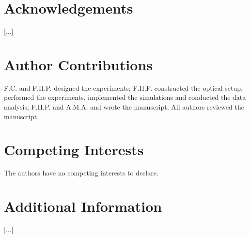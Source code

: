 \documentclass[10pt]{article}
\begin{document}
\begin{multicols}{2}






\printbibliography

\section*{Acknowledgements}
[...]

\section*{Author Contributions}
F.C. and F.H.P. designed the experiments; 
F.H.P. constructed the optical setup, performed the experiments, implemented the simulations and conducted the data analysis; 
F.H.P. and A.M.A. and wrote the manuscript; 
All authors reviewed the manuscript.

\section*{Competing Interests}
The authors have no competing interests to declare. 

\section*{Additional Information}
[...]












\end{multicols}
\end{document}
